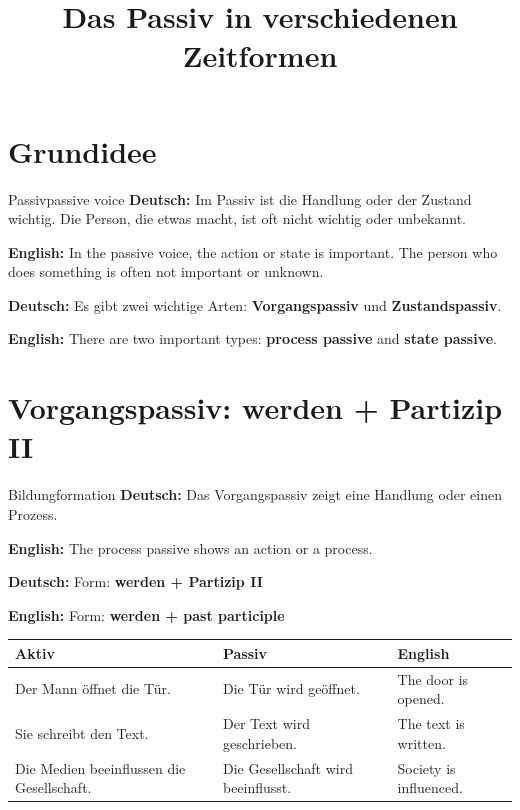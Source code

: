 \documentclass[a4paper,11pt]{article}
\title{Das Passiv in verschiedenen Zeitformen}
\date{}
\newcommand{\GermanText}[1]{\textbf{Deutsch: }#1\par}
\newcommand{\EnglishText}[1]{{\small\color{SoftGray}\textbf{English: }#1\par}}
\begin{document}
    \maketitle
    \tableofcontents
    \newpage

\section{Grundidee}

\begin{grammarentry}{Passiv}{passive voice}
\GermanText{Im Passiv ist die Handlung oder der Zustand wichtig. Die Person, die etwas macht, ist oft nicht wichtig oder unbekannt.}
\EnglishText{In the passive voice, the action or state is important. The person who does something is often not important or unknown.}

\GermanText{Es gibt zwei wichtige Arten: \textbf{Vorgangspassiv} und \textbf{Zustandspassiv}.}
\EnglishText{There are two important types: \textbf{process passive} and \textbf{state passive}.}
\end{grammarentry}

\section{Vorgangspassiv: werden + Partizip II}

\begin{grammarentry}{Bildung}{formation}
\GermanText{Das Vorgangspassiv zeigt eine Handlung oder einen Prozess.}
\EnglishText{The process passive shows an action or a process.}

\GermanText{Form: \textbf{werden + Partizip II}}
\EnglishText{Form: \textbf{werden + past participle}}

\begin{center}
\begin{tabular}{lll}
\textbf{Aktiv} & \textbf{Passiv} & \textbf{English} \\
\hline
Der Mann öffnet die Tür. & Die Tür wird geöffnet. & The door is opened. \\
Sie schreibt den Text. & Der Text wird geschrieben. & The text is written. \\
Die Medien beeinflussen die Gesellschaft. & Die Gesellschaft wird beeinflusst. & Society is influenced. \\
\end{tabular}
\end{center}
\end{grammarentry}
\end{document}
